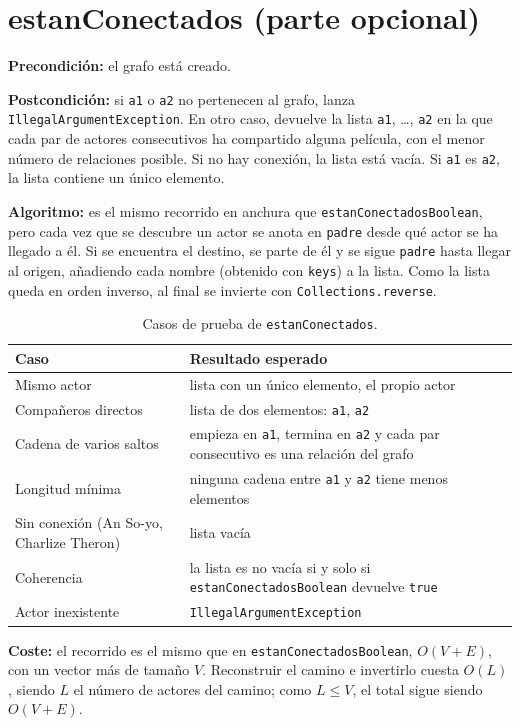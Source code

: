 \documentclass[a4paper,11pt]{report}
\newcommand{\coste}[1]{\par\noindent\textbf{Coste:} #1\par}
\newcommand{\espec}[2]{\par\noindent\textbf{Precondición:} #1\par\noindent\textbf{Postcondición:} #2\par}
\newcommand{\algoritmo}[1]{\par\noindent\textbf{Algoritmo:} #1\par}
\begin{document}
\section{\label{estanConectados}estanConectados (parte opcional)}
\espec{el grafo está creado.}
{si \texttt{a1} o \texttt{a2} no pertenecen al grafo, lanza \texttt{IllegalArgumentException}. En otro caso, devuelve la lista \texttt{a1}, \ldots, \texttt{a2} en la que cada par de actores consecutivos ha compartido alguna película, con el menor número de relaciones posible. Si no hay conexión, la lista está vacía. Si \texttt{a1} es \texttt{a2}, la lista contiene un único elemento.}
\algoritmo{es el mismo recorrido en anchura que \texttt{estanConectadosBoolean}, pero cada vez que se descubre un actor se anota en \texttt{padre} desde qué actor se ha llegado a él. Si se encuentra el destino, se parte de él y se sigue \texttt{padre} hasta llegar al origen, añadiendo cada nombre (obtenido con \texttt{keys}) a la lista. Como la lista queda en orden inverso, al final se invierte con \texttt{Collections.reverse}.}


\begin{table}[ht]
\centering
\begin{tabular}{p{5.2cm} p{8cm}}
\toprule
Caso & Resultado esperado \\
\midrule
Mismo actor & lista con un único elemento, el propio actor \\
Compañeros directos & lista de dos elementos: \texttt{a1}, \texttt{a2} \\
Cadena de varios saltos & empieza en \texttt{a1}, termina en \texttt{a2} y cada par consecutivo es una relación del grafo \\
Longitud mínima & ninguna cadena entre \texttt{a1} y \texttt{a2} tiene menos elementos \\
Sin conexión (An So-yo, Charlize Theron) & lista vacía \\
Coherencia & la lista es no vacía si y solo si \texttt{estanConectadosBoolean} devuelve \texttt{true} \\
Actor inexistente & \texttt{IllegalArgumentException} \\
\bottomrule
\end{tabular}
\caption{Casos de prueba de \texttt{estanConectados}.}
\end{table}

\coste{el recorrido es el mismo que en \texttt{estanConectadosBoolean}, $O(V+E)$, con un vector más de tamaño $V$. Reconstruir el camino e invertirlo cuesta $O(L)$, siendo $L$ el número de actores del camino; como $L \le V$, el total sigue siendo $O(V+E)$.}
\end{document}
